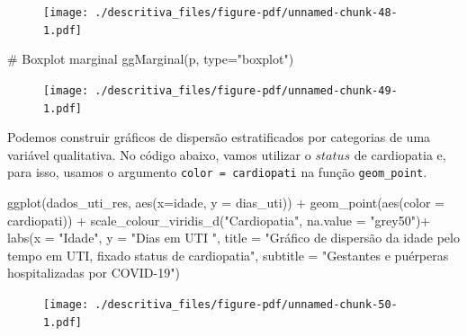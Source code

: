 \documentclass[
  letterpaper,
  DIV=11,
  numbers=noendperiod]{scrreprt}
\newenvironment{Shaded}{\begin{snugshade}}{\end{snugshade}}
\newcommand{\AttributeTok}[1]{\textcolor[rgb]{0.40,0.45,0.13}{#1}}
\newcommand{\CommentTok}[1]{\textcolor[rgb]{0.37,0.37,0.37}{#1}}
\newcommand{\FunctionTok}[1]{\textcolor[rgb]{0.28,0.35,0.67}{#1}}
\newcommand{\NormalTok}[1]{\textcolor[rgb]{0.00,0.23,0.31}{#1}}
\newcommand{\SpecialCharTok}[1]{\textcolor[rgb]{0.37,0.37,0.37}{#1}}
\newcommand{\StringTok}[1]{\textcolor[rgb]{0.13,0.47,0.30}{#1}}
\begin{document}
\begin{figure}[H]

{\centering \texttt{[image: ./descritiva\_files/figure-pdf/unnamed-chunk-48-1.pdf]}

}

\end{figure}

\begin{Shaded}
\begin{Highlighting}[]
\CommentTok{\# Boxplot marginal}
\FunctionTok{ggMarginal}\NormalTok{(p, }\AttributeTok{type=}\StringTok{"boxplot"}\NormalTok{)}
\end{Highlighting}
\end{Shaded}

\begin{figure}[H]

{\centering \texttt{[image: ./descritiva\_files/figure-pdf/unnamed-chunk-49-1.pdf]}

}

\end{figure}

Podemos construir gráficos de dispersão estratificados por categorias de
uma variável qualitativa. No código abaixo, vamos utilizar o \(status\)
de cardiopatia e, para isso, usamos o argumento
\texttt{color\ =\ cardiopati} na função \texttt{geom\_point}.

\begin{Shaded}
\begin{Highlighting}[]
\FunctionTok{ggplot}\NormalTok{(dados\_uti\_res, }\FunctionTok{aes}\NormalTok{(}\AttributeTok{x=}\NormalTok{idade, }\AttributeTok{y =}\NormalTok{ dias\_uti))  }\SpecialCharTok{+} 
  \FunctionTok{geom\_point}\NormalTok{(}\FunctionTok{aes}\NormalTok{(}\AttributeTok{color =}\NormalTok{ cardiopati)) }\SpecialCharTok{+}
  \FunctionTok{scale\_colour\_viridis\_d}\NormalTok{(}\StringTok{"Cardiopatia"}\NormalTok{, }\AttributeTok{na.value =} \StringTok{"grey50"}\NormalTok{)}\SpecialCharTok{+}
  \FunctionTok{labs}\NormalTok{(}\AttributeTok{x =} \StringTok{"Idade"}\NormalTok{, }\AttributeTok{y =} \StringTok{"Dias em UTI "}\NormalTok{, }\AttributeTok{title =} \StringTok{"Gráfico de dispersão da idade pelo tempo em UTI, fixado status de cardiopatia"}\NormalTok{, }\AttributeTok{subtitle =} \StringTok{"Gestantes e puérperas hospitalizadas por COVID{-}19"}\NormalTok{)}
\end{Highlighting}
\end{Shaded}

\begin{figure}[H]

{\centering \texttt{[image: ./descritiva\_files/figure-pdf/unnamed-chunk-50-1.pdf]}

}

\end{figure}
\end{document}
